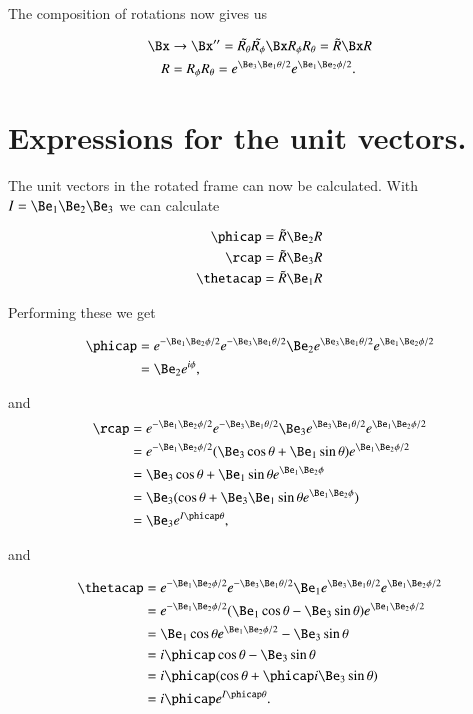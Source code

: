 The composition of rotations now gives us

\begin{align*}
\Bx
&\rightarrow \Bx'' = \tilde{R_\theta} \tilde{R_\phi} \Bx R_\phi R_\theta = \tilde{R} \Bx R \\
R &= R_\phi R_\theta = e^{ \Be_3 \Be_1 \theta/2 } e^{ \Be_1 \Be_2 \phi/2 }.
\end{align*}

\section{Expressions for the unit vectors.}

The unit vectors in the rotated frame can now be calculated.  With $I = \Be_1 \Be_2 \Be_3$ we can calculate

\begin{subequations}
\label{eqn:sphericalPolarLaplacian:201}
\begin{align}
\phicap &= \tilde{R} \Be_2 R  \\
\rcap &= \tilde{R} \Be_3 R  \\
\thetacap &= \tilde{R} \Be_1 R
\end{align}
\end{subequations}

Performing these we get

\begin{align*}
\phicap
&= e^{ -\Be_1 \Be_2 \phi/2 } e^{ -\Be_3 \Be_1 \theta/2 } \Be_2 e^{ \Be_3 \Be_1 \theta/2 } e^{ \Be_1 \Be_2 \phi/2 } \\
&= \Be_2 e^{ i \phi },
\end{align*}

and
\begin{align*}
\rcap
&= e^{ -\Be_1 \Be_2 \phi/2 } e^{ -\Be_3 \Be_1 \theta/2 } \Be_3 e^{ \Be_3 \Be_1 \theta/2 } e^{ \Be_1 \Be_2 \phi/2 } \\
&= e^{ -\Be_1 \Be_2 \phi/2 } (\Be_3 \cos\theta + \Be_1 \sin\theta ) e^{ \Be_1 \Be_2 \phi/2 } \\
&= \Be_3 \cos\theta +\Be_1 \sin\theta e^{ \Be_1 \Be_2 \phi } \\
&= \Be_3 (\cos\theta + \Be_3 \Be_1 \sin\theta e^{ \Be_1 \Be_2 \phi } ) \\
&= \Be_3 e^{I \phicap \theta},
\end{align*}

and

\begin{align*}
\thetacap
&= e^{ -\Be_1 \Be_2 \phi/2 } e^{ -\Be_3 \Be_1 \theta/2 } \Be_1 e^{ \Be_3 \Be_1 \theta/2 } e^{ \Be_1 \Be_2 \phi/2 } \\
&= e^{ -\Be_1 \Be_2 \phi/2 } ( \Be_1 \cos\theta - \Be_3 \sin\theta ) e^{ \Be_1 \Be_2 \phi/2 } \\
&= \Be_1 \cos\theta e^{ \Be_1 \Be_2 \phi/2 } - \Be_3 \sin\theta \\
&= i \phicap \cos\theta - \Be_3 \sin\theta \\
&= i \phicap (\cos\theta + \phicap i \Be_3 \sin\theta ) \\
&= i \phicap e^{I \phicap \theta}.
\end{align*}

